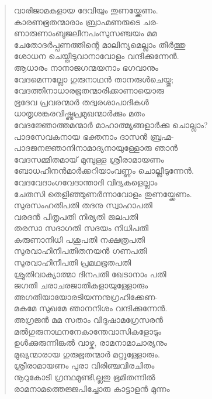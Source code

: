 \begin{verse}
വാരിജാമകളായ ദേവിയും തുണയ്ക്കേണം.\\
കാരണഭൂതന്മാരാം ബ്രാഹ്മണരുടെ ചര-\\
ണാരുണാംബുജലീനപംസുസഞ്ചയം മമ\\
ചേതോദര്‍പ്പണത്തിന്റെ മാലിന്യമെല്ലാം തീര്‍ത്തു\\
ശോധന ചെയ്തീടുവാനാവോളം വന്ദിക്കുന്നേന്‍.\\
ആധാരം നാനാജഗന്മയനാം ഭഗവാനും\\
വേദമെന്നല്ലോ ഗുരുനാഥന്‍ താനരുള്‍ചെയ്തു;\\
വേദത്തിനാധാരഭൂതന്മാരിക്കാണായൊരു\\
ഭൂദേവ പ്രവരന്മാര്‍ തദ്വരശാപാദികള്‍\\
ധാതൃശങ്കരവിഷ്ണുപ്രമുഖന്മാര്‍ക്കും മതം\\
വേദജ്ഞോത്തമന്മാര്‍ മാഹാത്മ്യങ്ങളാര്‍ക്കു ചൊല്ലാം?\\
പാദസേവകനായ ഭക്തനാം ദാസന്‍ ബ്രഹ്മ-\\
പാദജനജ്ഞാനിനാമാദ്യനായുള്ളോരു ഞാന്‍\\
വേദസമ്മിതമായ് മുമ്പുള്ള ശ്രീരാമായണം\\
ബോധഹീനന്‍മാര്‍ക്കറിയാംവണ്ണം ചൊല്ലീടുന്നേന്‍.\\
വേദവേദാംഗവേദാന്താദി വിദ്യകളെല്ലാം\\
ചേതസി തെളിഞ്ഞുണര്‍ന്നാവോളം തുണയ്ക്കേണം.\\
സുരസംഹതിപതി തദനു സ്വാഹാപതി\\
വരദന്‍ പിതൃപതി നിര്യതി ജലപതി\\
തരസാ സദാഗതി സദയം നിധിപതി\\
കരുണാനിധി പശുപതി നക്ഷത്രപതി\\
സുരവാഹിനീപതിതനയന്‍ ഗണപതി\\
സുരവാഹിനീപതി പ്രമഥഭൂതപതി\\
ശ്രുതിവാക്യാത്മാ ദിനപതി ഖേടാനാം പതി\\
ജഗതി ചരാചരജാതികളായുള്ളോരും\\
അഗതിയായോരടിയന്നനുഗ്രഹിക്കേണ-\\
മകമേ സുഖമേ ഞാനനിശം വന്ദിക്കുന്നേന്‍.\\
അഗ്രജന്‍ മമ സതാം വിദുഷാമഗ്രേസരന്‍\\
മല്‍ഗുരുനാഥനനേകാന്തേവാസികളോടും\\
ഉള്‍ക്കുരുന്നിങ്കല്‍ വാഴ്ക, രാമനാമാചാര്യനും\\
മുഖ്യന്മാരായ ഗുരുഭൂതന്മാര്‍ മറ്റുള്ളോരും.\\
ശ്രീരാമായണം പുരാ വിരിഞ്ചവിരചിതം\\
നൂറുകോടി ഗ്രന്ഥമുണ്ടി,ല്ലതു ഭൂമിതന്നില്‍\\
രാമനാമത്തെജ്ജപിച്ചോരു കാട്ടാളന്‍ മുന്നം\\

\end{verse}

